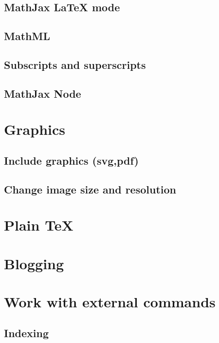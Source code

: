 \documentclass{book}
\begin{document}



\subsection{MathJax \LaTeX{} mode}
\label{sec:howto-mathjax}


\subsection{MathML}
\subsection{Subscripts and superscripts}

\subsection{MathJax Node}


\section{Graphics}
\subsection{Include graphics (svg,pdf)}
\subsection{Change image size and resolution}


\section{Plain \TeX}



\section{Blogging}

\section{Work with external commands}
\subsection{Indexing}
\label{sec:indexing}
\end{document}
